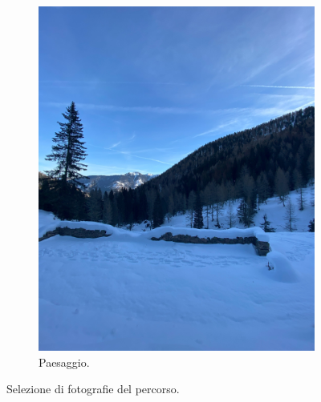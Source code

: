 \documentclass{article}
\begin{document}
\begin{figure}[htbp!]
\begin{subfigure}[b]{0.45\textwidth}
        \includegraphics[width=\textwidth]{images/foto_paesaggio.jpg}
        \caption{Paesaggio.}
    \end{subfigure}

    \caption{Selezione di fotografie del percorso.}
\end{figure}
\end{document}
